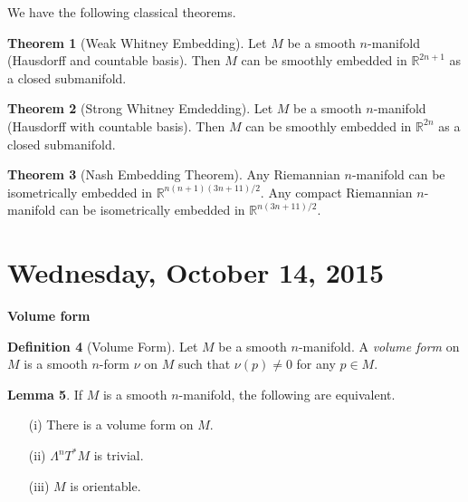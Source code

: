 \documentclass{amsart}
\numberwithin{equation}{section}
\newcommand{\bR}{\mathbb{R}}
\theoremstyle{definition}
\newtheorem{definition}{Definition} [section]
\theoremstyle{theorem}
\newtheorem{theorem}[definition]{Theorem}
\newtheorem{lemma}[definition]{Lemma}
\begin{document}
We have the following classical theorems.

\begin{theorem}[Weak Whitney Embedding]
Let $M$ be a smooth $n$-manifold (Hausdorff and countable basis). Then $M$ can be smoothly embedded in $\bR^{2n+1}$ as a closed submanifold. 
\end{theorem}

\begin{theorem}[Strong Whitney Emdedding]
Let $M$ be a smooth $n$-manifold (Hausdorff with countable basis). Then $M$ can be smoothly embedded in $\bR^{2n}$ as a closed submanifold. 
\end{theorem}



\begin{theorem}[Nash Embedding Theorem]
Any Riemannian $n$-manifold can be isometrically embedded in $\bR^{n(n+1)(3n+11)/2}$. 
Any compact Riemannian $n$-manifold can be isometrically embedded in 
$\bR^{n(3n+11)/2}$.
\end{theorem}



\section{Wednesday, October 14, 2015}


\noindent
{\large \bf Volume form}

\begin{definition}[Volume Form]
Let $M$ be a smooth $n$-manifold. A {\em volume form} on $M$ is a smooth $n$-form $\nu$ on $M$ such that $\nu(p) \ne 0$ for any $p \in M$.  
\end{definition}

\begin{lemma}
If $M$ is a smooth $n$-manifold, the following are equivalent. 
\begin{enumerate}
\item[(i)] There is a volume form on $M$.
\item[(ii)] $\Lambda^n T^*M$ is trivial. 
\item[(iii)] $M$ is orientable. 
\end{enumerate}
\end{lemma}
\end{document}
